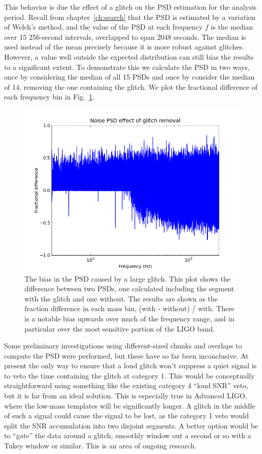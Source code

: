 This behavior is due the effect of a glitch on the PSD estimation for
the analysis period.  Recall from chapter~\ref{ch:search} that the PSD
is estimated by a variation of Welch's method, and the value of the
PSD at each frequency $f$ is the median over 15 256-second intervals,
overlapped to span 2048 seconds.  The median is used instead of the
mean precisely because it is more robust against glitches.  However, a
value well outside the expected distribution can still bias the
results to a significant extent.  To demonstrate this we calculate the
PSD in two ways, once by considering the median of all 15 PSDs and
once by consider the median of 14, removing the one containing the
glitch.  We plot the fractional difference of each frequency bin in
Fig.~\ref{f:median_bias}.


\begin{figure}
  \includegraphics[width=\linewidth]{figures/detchar/spectra_diffs}
  \caption[Bias in the PSD caused by a large glitch] {
  \label{f:median_bias}
The bias in the PSD caused by a large glitch.  This plot shows the
difference between two PSDs, one calculated including the
segment with the glitch and one without.  The results are shown as 
the fraction difference in each mass bin, (with - without) / with.
There is a notable bias upwards over much of the frequency range, and
in particular over the most sensitive portion of the LIGO band.
}
\end{figure}%

Some preliminary investigations using different-sized chunks and
overlaps to compute the PSD were performed, but these have so far been
inconclusive.  At present the only way to ensure that a loud glitch
won't suppress a quiet signal is to veto the time containing the
glitch at category 1.  This would be conceptually straightforward
using something like the existing category 4 ``loud SNR'' veto, but it
is far from an ideal solution.  This is especially true in Advanced
LIGO, where the low-mass templates will be significantly longer.  A
glitch in the middle of such a signal could cause the signal to be
lost, as the category 1 veto would split the SNR accumulation into two
disjoint segments.   A better option would be to ``gate'' the data
around a glitch; smoothly window out a second or so with a Tukey
window or similar.  This is an area of ongoing research.




